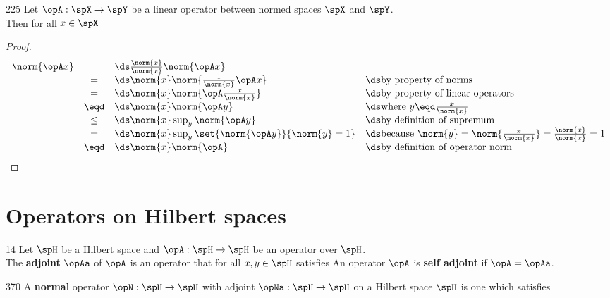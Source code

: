 \begin{theorem}
\citep{ab}{225}
Let $\opA:\spX\to\spY$ be a linear operator between normed spaces
$\spX$ and $\spY$. \\
Then for all $x\in\spX$
\end{theorem}
\begin{proof}
\[\begin{array}{rcll}
  \norm{\opA x}
    &=&    \ds \frac{\norm{x}}{\norm{x}} \norm{\opA x}
  \\&=&    \ds \norm{x} \norm{\frac{1}{\norm{x}}\opA x}
      &    \ds \mbox{by property of norms}
  \\&=&    \ds \norm{x} \norm{\opA \frac{x}{\norm{x}}}
      &    \ds \mbox{by property of linear operators}
  \\&\eqd& \ds \norm{x} \norm{\opA y}
      &    \ds \mbox{where $y\eqd\frac{x}{\norm{x}}$}
  \\&\le&  \ds \norm{x} \sup_y \norm{\opA y}
      &    \ds \mbox{by definition of supremum}
  \\&=&    \ds \norm{x} \sup_y\set{ \norm{\opA y}}{\norm{y}=1}
      &    \ds \mbox{because $\norm{y}=\norm{\frac{x}{\norm{x}}}=\frac{\norm{x}}{\norm{x}}=1$}
  \\&\eqd& \ds \norm{x} \norm{\opA}
      &    \ds \mbox{by definition of operator norm}
\end{array}\]
\end{proof}
\section{Operators on Hilbert spaces}
\begin{definition}
\citep{keener}{14}
Let $\spH$ be a Hilbert space and
$\opA:\spH\to\spH$ be an operator over $\spH$.\\ 
The {\bf adjoint} $\opAa$ of $\opA$ is an operator that 
for all $x,y\in\spH$ satisfies
An operator $\opA$ is {\bf self adjoint} if $\opA=\opAa$.
\end{definition}

\begin{definition}
\citep{lax}{370}
A {\bf normal} operator $\opN:\spH\to\spH$ with 
adjoint $\opNa:\spH\to\spH$ on a Hilbert space $\spH$ 
is one which satisfies
\end{definition}

